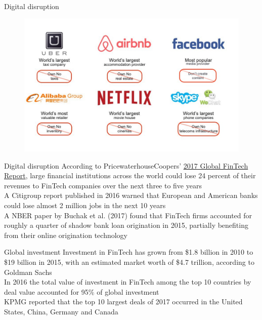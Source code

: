 \documentclass[10pt]{beamer}
\begin{document}
\begin{frame}{Digital disruption}
	\begin{figure}[]
		\centering
		\includegraphics  [scale=0.3]{Images/disruption}
	\end{figure}
\end{frame}


\begin{frame}{Digital disruption}
	According to PricewaterhouseCoopers' \href{http://www.pwc.com/ee/et/publications/pub/pwc-global-fintech-report-2017.pdf}{2017 Global FinTech Report}, large financial institutions across the world could lose 24 percent of their revenues to FinTech companies over the next three to five years\\ \vspace{3mm}
	A Citigroup report published in 2016 warned that European and American banks could lose almost 2 million jobs in the next 10 years \\ \vspace{3mm}
	A NBER paper by Buchak et al. (2017) found that FinTech firms accounted for roughly a quarter of shadow bank loan origination in 2015, partially benefiting from their online origination technology \\ \vspace{3mm}
\end{frame}


\begin{frame}{Global investment}
	Investment in FinTech has grown from \$1.8 billion in 2010 to \$19 billion in 2015, with an estimated market worth of \$4.7 trillion, according to Goldman Sachs \\ \vspace{3mm}
	In 2016 the total value of investment in FinTech among the top 10 countries by deal value accounted for 95\% of global investment \\ \vspace{3mm}
	KPMG reported that the top 10 largest deals of 2017 occurred in the United States, China, Germany and Canada
\end{frame}
\end{document}

